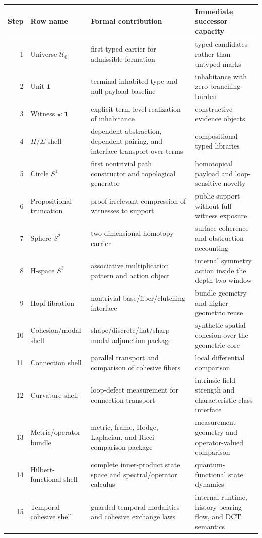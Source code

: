 \documentclass[11pt]{article}
\theoremstyle{plain}
\theoremstyle{definition}
\theoremstyle{remark}
\newcommand{\DCT}{\mathrm{DCT}}
\newcommand{\U}{\mathcal{U}}
\begin{document}
\begin{longtable}{@{}r>{\raggedright\arraybackslash}p{}>{\raggedright\arraybackslash}p{}>{\raggedright\arraybackslash}p{}@{}}
\toprule
Step & Row name & Formal contribution & Immediate successor capacity \\
\midrule
\endhead
1 & Universe \(\U_0\) & first typed carrier for admissible formation & typed candidates rather than untyped marks \\
2 & Unit \(\mathbf{1}\) & terminal inhabited type and null payload baseline & inhabitance with zero branching burden \\
3 & Witness \(\star:\mathbf{1}\) & explicit term-level realization of inhabitance & constructive evidence objects \\
4 & \(\Pi/\Sigma\) shell & dependent abstraction, dependent pairing, and interface transport over terms & compositional typed libraries \\
5 & Circle \(S^1\) & first nontrivial path constructor and topological generator & homotopical payload and loop-sensitive novelty \\
6 & Propositional truncation & proof-irrelevant compression of witnesses to support & public support without full witness exposure \\
7 & Sphere \(S^2\) & two-dimensional homotopy carrier & surface coherence and obstruction accounting \\
8 & H-space \(S^3\) & associative multiplication pattern and action object & internal symmetry action inside the depth-two window \\
9 & Hopf fibration & nontrivial base/fiber/clutching interface & bundle geometry and higher geometric reuse \\
10 & Cohesion/modal shell & shape/discrete/flat/sharp modal adjunction package & synthetic spatial cohesion over the geometric core \\
11 & Connection shell & parallel transport and comparison of cohesive fibers & local differential comparison \\
12 & Curvature shell & loop-defect measurement for connection transport & intrinsic field-strength and characteristic-class interface \\
13 & Metric/operator bundle & metric, frame, Hodge, Laplacian, and Ricci comparison package & measurement geometry and operator-valued comparison \\
14 & Hilbert-functional shell & complete inner-product state space and spectral/operator calculus & quantum-functional state dynamics \\
15 & Temporal-cohesive shell & guarded temporal modalities and cohesive exchange laws & internal runtime, history-bearing flow, and \(\DCT\) semantics \\
\bottomrule
\end{longtable}
\end{document}
